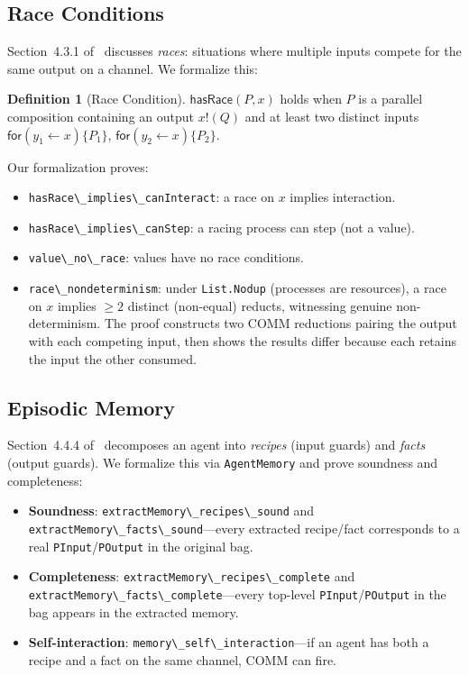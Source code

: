 \documentclass[11pt,a4paper]{article}
\theoremstyle{definition}
\newtheorem{definition}[theorem]{Definition}
\theoremstyle{remark}
\newcommand{\pout}[2]{#1\mathbin{!}(#2)}
\newcommand{\pin}[3]{\mathsf{for}(#1 \leftarrow #2)\{#3\}}
\newcommand{\lean}[1]{\lstinline[language=Lean4]{#1}}
\begin{document}
\subsection{Race Conditions}
\label{sec:races}

Section~4.3.1 of~\cite{meredith2026spice} discusses \emph{races}: situations where
multiple inputs compete for the same output on a channel.  We formalize this:

\begin{definition}[Race Condition]
$\mathsf{hasRace}(P, x)$ holds when $P$ is a parallel composition containing
an output $\pout{x}{Q}$ and at least two distinct inputs
$\pin{y_1}{x}{P_1}$, $\pin{y_2}{x}{P_2}$.
\end{definition}

Our formalization proves:
\begin{itemize}[nosep]
  \item \lean{hasRace\_implies\_canInteract}: a race on $x$ implies interaction.
  \item \lean{hasRace\_implies\_canStep}: a racing process can step (not a value).
  \item \lean{value\_no\_race}: values have no race conditions.
  \item \lean{race\_nondeterminism}: under \lean{List.Nodup} (processes are
    resources), a race on $x$ implies $\geq\!2$ distinct (non-equal) reducts,
    witnessing genuine non-determinism.  The proof constructs two COMM
    reductions pairing the output with each competing input, then shows the
    results differ because each retains the input the other consumed.
\end{itemize}

\subsection{Episodic Memory}
\label{sec:memory}

Section~4.4.4 of~\cite{meredith2026spice} decomposes an agent into \emph{recipes}
(input guards) and \emph{facts} (output guards).  We formalize this via
\lean{AgentMemory} and prove soundness and completeness:

\begin{itemize}[nosep]
  \item \textbf{Soundness}: \lean{extractMemory\_recipes\_sound} and
    \lean{extractMemory\_facts\_sound}---every extracted recipe/fact
    corresponds to a real \lean{PInput}/\lean{POutput} in the original bag.
  \item \textbf{Completeness}: \lean{extractMemory\_recipes\_complete} and
    \lean{extractMemory\_facts\_complete}---every top-level
    \lean{PInput}/\lean{POutput} in the bag appears in the extracted memory.
  \item \textbf{Self-interaction}: \lean{memory\_self\_interaction}---if an
    agent has both a recipe and a fact on the same channel, COMM can fire.
\end{itemize}
\end{document}
